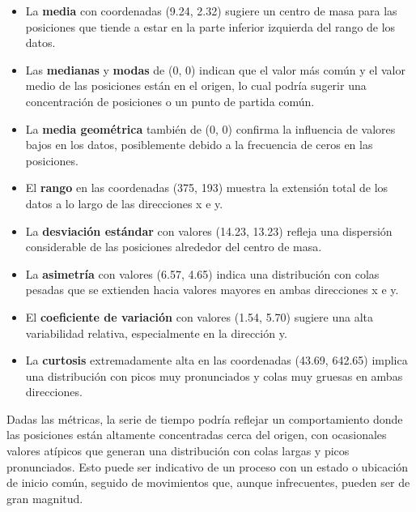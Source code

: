 \documentclass[11pt]{article} %
\begin{document}
	 \begin{itemize}
	 	\item La \textbf{media} con coordenadas (9.24, 2.32) sugiere un centro de masa para las posiciones que tiende a estar en la parte inferior izquierda del rango de los datos.
	 	\item Las \textbf{medianas} y \textbf{modas} de (0, 0) indican que el valor más común y el valor medio de las posiciones están en el origen, lo cual podría sugerir una concentración de posiciones o un punto de partida común.
	 	\item La \textbf{media geométrica} también de (0, 0) confirma la influencia de valores bajos en los datos, posiblemente debido a la frecuencia de ceros en las posiciones.
	 	\item El \textbf{rango} en las coordenadas (375, 193) muestra la extensión total de los datos a lo largo de las direcciones x e y.
	 	\item La \textbf{desviación estándar} con valores (14.23, 13.23) refleja una dispersión considerable de las posiciones alrededor del centro de masa.
	 	\item La \textbf{asimetría} con valores (6.57, 4.65) indica una distribución con colas pesadas que se extienden hacia valores mayores en ambas direcciones x e y.
	 	\item El \textbf{coeficiente de variación} con valores (1.54, 5.70) sugiere una alta variabilidad relativa, especialmente en la dirección y.
	 	\item La \textbf{curtosis} extremadamente alta en las coordenadas (43.69, 642.65) implica una distribución con picos muy pronunciados y colas muy gruesas en ambas direcciones.
	 \end{itemize}
	 
	 Dadas las métricas, la serie de tiempo podría reflejar un comportamiento donde las posiciones están altamente concentradas cerca del origen, con ocasionales valores atípicos que generan una distribución con colas largas y picos pronunciados. Esto puede ser indicativo de un proceso con un estado o ubicación de inicio común, seguido de movimientos que, aunque infrecuentes, pueden ser de gran magnitud.
	
	
\end{document}
